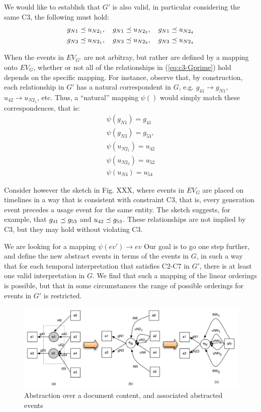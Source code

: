 We would like to establish that $G'$ is also valid, in particular considering the same C3, the following must hold:
\begin{align}
\label{eq:c3-Gprime}
g_{N1} \preceq u_{N2_1}, \quad g_{N1} \preceq u_{N2_2}, \quad g_{N1} \preceq u_{N2_4} \\
g_{N3} \preceq u_{N2_1}, \quad g_{N3} \preceq u_{N2_2}, \quad g_{N3} \preceq u_{N2_4} 
\end{align}

When the events in $EV_{G'}$ are not arbitray, but rather are defined by a mapping onto $EV_G$, whether or not all of the relationships in (\ref{eq:c3-Gprime}) hold depends on the specific mapping.
For instance, observe that, by construction, each relationship in $G'$ has a natural correspondent in $G$, e.g. $g_{41} \rightarrow g_{N1}$, $u_{42} \rightarrow u_{N2_1}$, etc.
Thus, a ``natural'' mapping $\psi()$ would simply match these correspondences, that is:
\begin{align}
\psi(g_{N1}) = g_{41}\\
\psi(g_{N3}) = g_{53}, \\
\psi(u_{N2_1}) = u_{42} \\
\psi(u_{N2_2}) = u_{52}  \\
\psi(u_{N4}) = u_{54}
\end{align}

Consider however the sketch in Fig. XXX, where events in $EV_G$ are placed on timelines in a way that is consistent with constraint C3, that is, every generation event precedes a usage event for the same entity.
The sketch suggests, for example, that $g_{41} \preceq g_{53}$ and $u_{42} \preceq g_{53}$. These relationships are not implied by C3, but they may hold without violating C3.




We are looking for a mapping $\psi(ev') \rightarrow ev$ 
Our goal is to go one step further, and define the new abstract events in terms of the events in $G$, in such a way that for each temporal interpretation that satisfies C2-C7 in $G'$, there is at least one valid interpretation in $G$.
%
We find that such a mapping of the linear orderings is possible,  but that in some circumstances the range of possible orderings for events in $G'$ is restricted.


\begin{figure}
\centering
\includegraphics[scale=.5]{figures/e4-e5.pdf} 
\caption{Abstraction over a document content, and associated abstracted events} \label{fig:e4-e5}
\end{figure}

